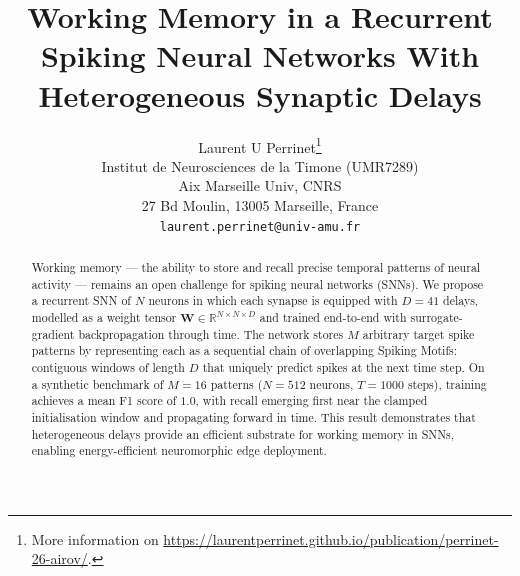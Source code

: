 \documentclass{article}
\title{
Working Memory in a Recurrent Spiking Neural Networks With Heterogeneous Synaptic Delays
}
\author{%
  Laurent U Perrinet\thanks{More information on \url{https://laurentperrinet.github.io/publication/perrinet-26-airov/}.} \\
  Institut de Neurosciences de la Timone (UMR7289) \\
  Aix Marseille Univ, CNRS\\
  27 Bd Moulin, 13005 Marseille, France \\
  \texttt{laurent.perrinet@univ-amu.fr} \\
}
\begin{document}
\maketitle



\begin{abstract}
Working memory --- the ability to store and recall precise temporal patterns of neural activity --- remains an open challenge for spiking neural networks (SNNs). We propose a recurrent SNN of $N$ neurons in which each synapse is equipped with $D = 41$ delays, modelled as a weight tensor $\mathbf{W} \in \mathbb{R}^{N \times N \times D}$ and trained end-to-end with surrogate-gradient backpropagation through time. The network stores $M$ arbitrary target spike patterns by representing each as a sequential chain of overlapping Spiking Motifs: contiguous windows of length $D$ that uniquely predict spikes at the next time step. On a synthetic benchmark of $M=16$ patterns ($N=512$ neurons, $T=1000$ steps), training achieves a mean F1 score of $1.0$, with recall emerging first near the clamped initialisation window and propagating forward in time. This result demonstrates that heterogeneous delays provide an efficient substrate for working memory in SNNs, enabling energy-efficient neuromorphic edge deployment.
\end{abstract}
\end{document}
